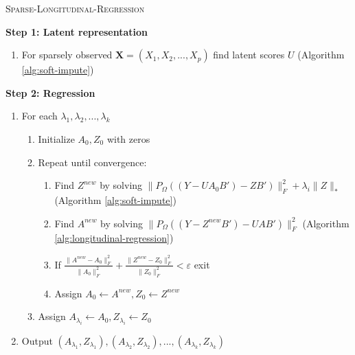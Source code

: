 \documentclass[preprint]{imsart}
\numberwithin{equation}{section}
\theoremstyle{plain}
\newcommand{\bX}{\mathbf{X}}
\newcommand{\tr}[1]{{\textcolor{red}{#1}}}
\begin{document}
\begin{algorithm}
\caption{\textsc{Sparse-Longitudinal-Regression}\label{alg:sparse-regression}}
\vspace{3pt}
\begin{flushleft}
\textbf{Step 1: Latent representation}
\end{flushleft}
\begin{enumerate}
\item For sparsely observed $\bX = (X_1,X_2,...,X_p)$ find latent scores $U$ (Algorithm \ref{alg:soft-impute})
\end{enumerate}
\begin{flushleft}
\textbf{Step 2: Regression}
\end{flushleft}
\begin{enumerate}
\item For each $\lambda_1,\lambda_2,...,\lambda_k$
  \begin{enumerate}
  \item Initialize $A_0,Z_0$ with zeros
  \item Repeat until convergence:
    \begin{enumerate}
    \item Find $Z^{new}$ by solving $\|P_\Omega( (Y - UA_0B') - ZB')\|_F^2 + \lambda_i\|Z\|_*$ (Algorithm \ref{alg:soft-impute})
    \item Find $A^{new}$ by solving $\|P_\Omega( (Y - Z^{new}B') - UAB')\|_F^2$ (Algorithm \ref{alg:longitudinal-regression})
    \item If $\frac{\|A^{new} - A_0\|_F^2}{\|A_0\|_F^2} + \frac{\|Z^{new} - Z_0\|_F^2}{\|Z_0\|_F^2} < \varepsilon$ exit
    \item Assign $A_0 \leftarrow A^{new},Z_0 \leftarrow Z^{new}$
    \end{enumerate}
  \item Assign $A_{\lambda_i} \leftarrow A_0, Z_{\lambda_i} \leftarrow Z_0$
  \end{enumerate}
\item Output $(A_{\lambda_1},Z_{\lambda_1}), (A_{\lambda_2},Z_{\lambda_2}), ..., (A_{\lambda_k},Z_{\lambda_k})$
\end{enumerate}
\end{algorithm}
\end{document}
